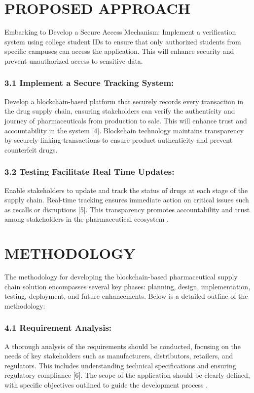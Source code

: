 \documentclass[runningheads]{llncs}
\begin{document}
\section{PROPOSED APPROACH}
Embarking to Develop a Secure Access Mechanism: 
Implement a verification system using college student IDs 
to ensure that only authorized students from specific 
campuses can access the application. This will enhance 
security and prevent unauthorized access to sensitive data.

\subsubsection{3.1 Implement a Secure Tracking System:}
Develop a blockchain-based platform that securely records every transaction in the drug supply chain, ensuring stakeholders can verify the authenticity and journey of pharmaceuticals from production to sale. This will enhance trust and accountability in the system [4]. Blockchain technology maintains transparency by securely linking transactions to ensure product authenticity and prevent counterfeit drugs.

\subsubsection{3.2 Testing Facilitate Real Time Updates:}
 Enable stakeholders to update and track the status of drugs at each stage of the supply chain. Real-time tracking ensures immediate action on critical issues such as recalls or disruptions [5]. This transparency promotes accountability and trust among stakeholders in the pharmaceutical ecosystem .

\section{METHODOLOGY}
The methodology for developing the blockchain-based pharmaceutical supply chain solution encompasses several key phases: planning, design, implementation, testing, deployment, and future enhancements. Below is a detailed outline of the methodology:

\subsubsection{4.1 Requirement Analysis:}
A thorough analysis of the requirements should be conducted, focusing on the needs of key stakeholders such as manufacturers, distributors, retailers, and regulators. This includes understanding technical specifications and ensuring regulatory compliance [6]. The scope of the application should be clearly defined, with specific objectives outlined to guide the development process .
\end{document}
